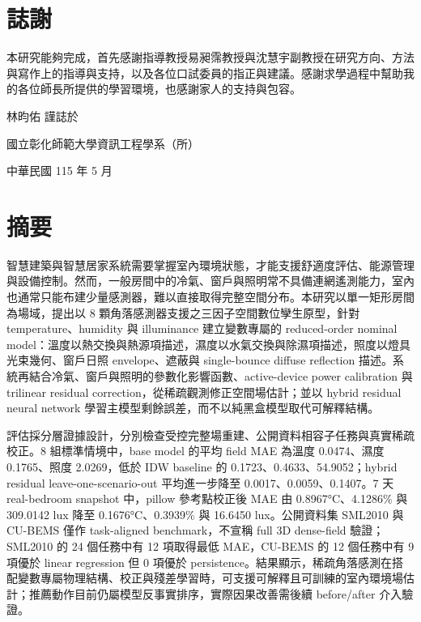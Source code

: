 \documentclass[12pt,a4paper]{article}
\begin{document}
\section*{誌謝}

本研究能夠完成，首先感謝指導教授易昶霈教授與沈慧宇副教授在研究方向、方法與寫作上的指導與支持，以及各位口試委員的指正與建議。感謝求學過程中幫助我的各位師長所提供的學習環境，也感謝家人的支持與包容。


林昀佑 謹誌於


國立彰化師範大學資訊工程學系（所）


中華民國 115 年 5 月


\clearpage

\section*{摘要}

智慧建築與智慧居家系統需要掌握室內環境狀態，才能支援舒適度評估、能源管理與設備控制。然而，一般房間中的冷氣、窗戶與照明常不具備連網遙測能力，室內也通常只能布建少量感測器，難以直接取得完整空間分布。本研究以單一矩形房間為場域，提出以 8 顆角落感測器支援之三因子空間數位孿生原型，針對 temperature、humidity 與 illuminance 建立變數專屬的 reduced-order nominal model：溫度以熱交換與熱源項描述，濕度以水氣交換與除濕項描述，照度以燈具光束幾何、窗戶日照 envelope、遮蔽與 single-bounce diffuse reflection 描述。系統再結合冷氣、窗戶與照明的參數化影響函數、active-device power calibration 與 trilinear residual correction，從稀疏觀測修正空間場估計；並以 hybrid residual neural network 學習主模型剩餘誤差，而不以純黑盒模型取代可解釋結構。


評估採分層證據設計，分別檢查受控完整場重建、公開資料相容子任務與真實稀疏校正。8 組標準情境中，base model 的平均 field MAE 為溫度 0.0474、濕度 0.1765、照度 2.0269，低於 IDW baseline 的 0.1723、0.4633、54.9052；hybrid residual leave-one-scenario-out 平均進一步降至 0.0017、0.0059、0.1407。7 天 real-bedroom snapshot 中，pillow 參考點校正後 MAE 由 0.8967°C、4.1286\% 與 309.0142 lux 降至 0.1676°C、0.3939\% 與 16.6450 lux。公開資料集 SML2010 與 CU-BEMS 僅作 task-aligned benchmark，不宣稱 full 3D dense-field 驗證；SML2010 的 24 個任務中有 12 項取得最低 MAE，CU-BEMS 的 12 個任務中有 9 項優於 linear regression 但 0 項優於 persistence。結果顯示，稀疏角落感測在搭配變數專屬物理結構、校正與殘差學習時，可支援可解釋且可訓練的室內環境場估計；推薦動作目前仍屬模型反事實排序，實際因果改善需後續 before/after 介入驗證。
\end{document}
